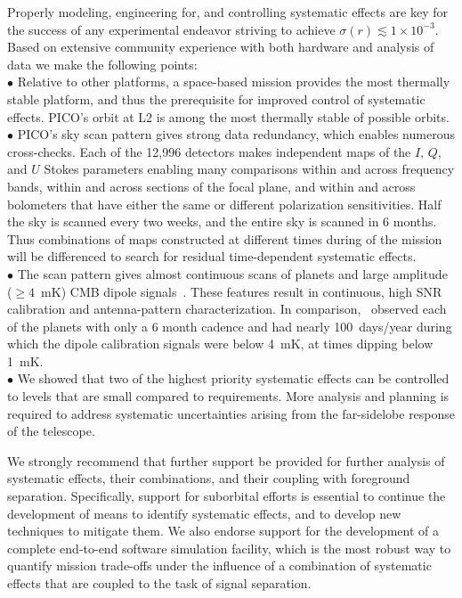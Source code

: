 \documentclass[PICOReport.tex]{subfiles}
\begin{document}
Properly modeling, engineering for, and controlling systematic effects are key for the success of any experimental endeavor striving to achieve $\sigma(r) \lesssim 1 \times 10^{-3}$. Based on extensive community experience with both hardware and analysis of data we make the following points: \\
$\bullet$ \hspace{0.1in}  Relative to other platforms, a space-based mission provides the most thermally stable platform, and thus the prerequisite for improved control of systematic effects. PICO's orbit at L2 is among the most thermally stable of possible orbits. \\
$\bullet$ \hspace{0.1in} PICO's sky scan pattern gives strong data redundancy, which enables numerous cross-checks. Each of the 12,996 detectors makes independent maps of the $I,\,Q$, and $U$ Stokes parameters enabling many comparisons within and across frequency bands, within and across sections of the focal plane, and within and across bolometers that have either the same or different polarization sensitivities. Half the sky is scanned every two weeks, and the entire sky is scanned in 6 months. Thus combinations of maps constructed at different times during of the mission will be differenced to search for residual time-dependent systematic effects. \\
$\bullet$ \hspace{0.1in}  The scan pattern gives almost continuous scans of planets and large amplitude ($\geq 4$~mK) CMB dipole signals~\citep{picoweb_dipole}. These features result in continuous, high \ac{SNR} calibration and antenna-pattern characterization. In comparison, \planck\ observed each of the planets with only a 6 month cadence and had nearly 100~days/year during which the dipole calibration signals were below 4~mK, at times dipping below 1~mK. \\
$\bullet$ \hspace{0.1in}  We showed that two of the highest priority systematic effects can be controlled to levels that are small compared to requirements. More analysis and planning is required to address systematic uncertainties arising from the far-sidelobe response of the telescope. 

We strongly recommend that further support be provided for further analysis of systematic effects, their combinations, and their coupling with foreground separation. Specifically, support for suborbital efforts is essential to continue the development of means to identify systematic effects, and to develop new techniques to mitigate them. We also endorse support for the development of a complete end-to-end software simulation facility, which is the most robust way to quantify mission trade-offs under the influence of a combination of systematic effects that are coupled to the task of signal separation.  
\end{document}
